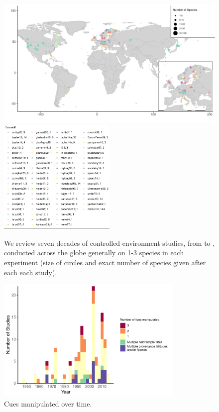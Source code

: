 \documentclass[11pt,letter]{article}
\begin{document}
\clearpage

\begin{figure}[t!]
\centering
\includegraphics[width=1\textwidth]{..//..//analyses/limitingcues/figures/maps/map_studyspp.pdf}
\includegraphics[width=0.5\textwidth]{..//..//analyses/limitingcues/figures/maps/map_studyspp_legend.pdf}
\caption{We review seven decades of controlled environment studies, from \citet{Lamb:1948aa} to \citet{zohner2016}, conducted across the globe generally on 1-3 species in each experiment (size of circles and exact number of species given after each each study). }
  \label{fig:datamap} %
\end{figure}


\begin{figure}[t!]
\centering
\includegraphics[width=0.8\textwidth]{..//..//analyses/limitingcues/figures/studyyearcues.pdf}
\caption{Cues manipulated over time.}
  \label{fig:ts}
\end{figure}
\end{document}
